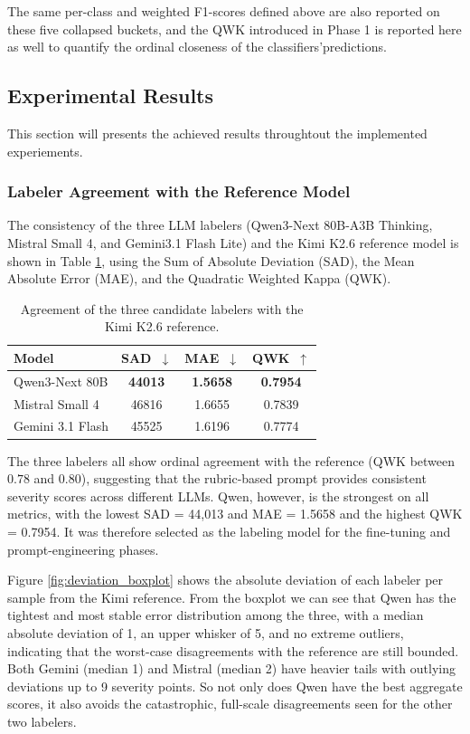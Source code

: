 \documentclass[conference]{IEEEtran}
\makeatletter
\let\end\a@l@end
\makeatother
\begin{document}
\noindent The same per-class and weighted F1-scores defined above are also reported on these five collapsed buckets, and the QWK introduced in Phase 1 is reported here as well to quantify the ordinal closeness of the classifiers'predictions.


\subsection{Experimental Results}
This section will presents the achieved results throughtout the implemented experiements.

\subsubsection{Labeler Agreement with the Reference Model}
The consistency of the three LLM labelers (Qwen3-Next 80B-A3B Thinking, Mistral Small 4, and Gemini3.1 Flash Lite) and the Kimi K2.6 reference model is shown in Table \ref{tab:poc_agreement}, using the Sum of Absolute Deviation (SAD), the Mean Absolute Error (MAE), and the Quadratic Weighted Kappa (QWK).
\begin{table}[ht]
\centering
\caption{Agreement of the three candidate labelers with the Kimi K2.6 reference.}
\label{tab:poc_agreement}
\begin{tabular}{lccc}
\toprule
Model            & SAD~$\downarrow$ & MAE~$\downarrow$ & QWK~$\uparrow$ \\
\midrule
Qwen3-Next 80B   & \textbf{44013} & \textbf{1.5658} & \textbf{0.7954} \\
Mistral Small 4  & 46816          & 1.6655          & 0.7839 \\
Gemini 3.1 Flash & 45525          & 1.6196          & 0.7774 \\
\bottomrule
\end{tabular}
\end{table}

The three labelers all show ordinal agreement with the reference (QWK between $0.78$ and $0.80$), suggesting that the rubric-based prompt provides consistent severity scores across different LLMs. Qwen, however, is the strongest on all metrics, with the lowest SAD = 44,013 and MAE = 1.5658 and the highest QWK = 0.7954. It was therefore selected as the labeling model for the fine-tuning and prompt-engineering phases.

Figure \ref{fig:deviation_boxplot} shows the absolute deviation of each labeler per sample from the Kimi reference. From the boxplot we can see that Qwen has the tightest and most stable error distribution among the three, with a median absolute deviation of 1, an upper whisker of 5, and no extreme outliers, indicating that the worst-case disagreements with the reference are still bounded. Both Gemini (median 1) and Mistral (median 2) have heavier tails with outlying deviations up to 9 severity points. So not only does Qwen have the best aggregate scores, it also avoids the catastrophic, full-scale disagreements seen for the other two labelers.
\end{document}
